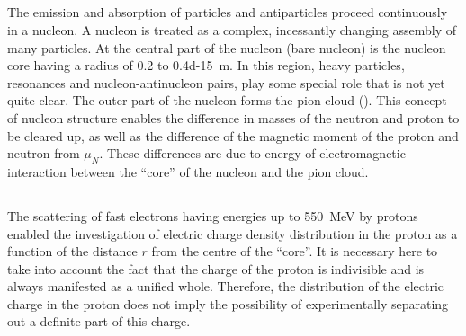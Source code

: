 \subsection{}\label{43.6.2} The emission and absorption of particles and antiparticles proceed continuously in a nucleon. A nucleon is treated as a complex, incessantly changing assembly of many particles. At the central part of the nucleon (bare nucleon) is the nucleon core having a radius of 0.2 to \SI{0.4d-15}{\meter}. In this region, heavy
particles, resonances and nucleon-antinucleon pairs, play some special role that is not yet quite clear. The outer part of the nucleon forms the pion cloud (). This concept of nucleon structure enables the difference in masses of the neutron and proton to be cleared up, as well as the difference of the magnetic moment of the proton and neutron from $\mu_{N}$. These differences are due to energy of electromagnetic interaction between the ``core'' of the nucleon and the pion cloud.



\subsection{}\label{43.6.3} The scattering of fast electrons having energies up to \SI{550}{\MeV} by protons enabled the investigation of electric charge density distribution in the proton as a function of the distance $r$ from the centre of the ``core''. It is necessary here to take into account the fact that the charge of the proton is indivisible and is always manifested as a unified whole. Therefore, the  distribution of the electric charge in the proton does not imply the possibility of experimentally separating out a definite part of this charge. 

